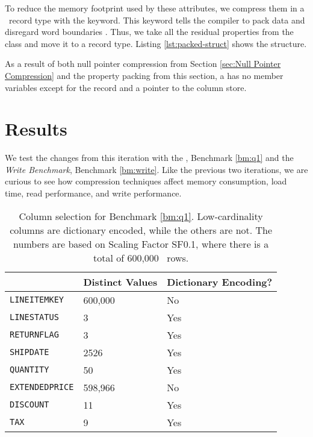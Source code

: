 To reduce the memory footprint used by these attributes, we compress them in a \delphi~record type with the  keyword. This keyword tells the compiler to pack data and disregard word boundaries \cite{noauthor_undated-vu}. Thus, we take all the residual properties from the  class and move it to a  record type. Listing \ref{lst:packed-struct} shows the structure.

As a result of both null pointer compression from Section \ref{sec:Null Pointer Compression} and the property packing from this section, a  has no member variables except for the  record and a pointer to the column store.

\section{Results}
\label{sec:Results}
We test the changes from this iteration with the \tpchdl, Benchmark \ref{bm:q1} and the \textit{Write Benchmark}, Benchmark \ref{bm:write}. Like the previous two iterations, we are curious to see how compression techniques affect memory consumption, load time, read performance, and write performance. 



\begin{table}
    \begin{tabularx}{\textwidth}{X | X X}
        & Distinct Values & Dictionary Encoding? \\ 
        \hline
        \hline
        \texttt{LINEITEMKEY} & 600,000 & No \\
        \texttt{LINESTATUS} & 3 & Yes \\
        \texttt{RETURNFLAG} & 3 & Yes \\
        \texttt{SHIPDATE} & 2526 & Yes \\
        \texttt{QUANTITY} & 50 & Yes \\
        \texttt{EXTENDEDPRICE} & 598,966 & No \\
        \texttt{DISCOUNT} & 11 & Yes \\
        \texttt{TAX} & 9 & Yes
    \end{tabularx}
    \caption{Column selection for Benchmark \ref{bm:q1}. Low-cardinality columns are dictionary encoded, while the others are not. The numbers are based on Scaling Factor SF0.1, where there is a total of 600,000 \lineitem~rows.}
    \label{tab:column-selection}
\end{table}

